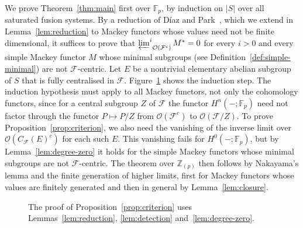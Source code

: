 \documentclass[10pt]{amsart}
\theoremstyle{definition}
\numberwithin{equation}{section}
\newcommand{\F}{\mathcal F}
\newcommand{\Op}{\mathcal O}
\newcommand{\limi}[2]{\mathop{\varprojlim\nolimits^{#1}}_{#2}}
\begin{document}
We prove Theorem~\ref{thm:main} first over $\mathbb{F}_p$, by induction on $|S|$ over all saturated fusion systems. By a reduction of D\'iaz and Park~\cite[Proposition~4.3]{DP}, which we extend in Lemma~\ref{lem:reduction} to Mackey functors whose values need not be finite dimensional, it suffices to prove that $\limi{i}{\Op(\F^c)}M^*=0$ for every $i>0$ and every simple Mackey functor $M$ whose minimal subgroups (see Definition~\ref{def:simple-minimal}) are not $\F$-centric. Let $E$ be a nontrivial elementary abelian subgroup of $S$ that is fully centralised in $\F$. Figure~\ref{fig:induction} shows the induction step. The induction hypothesis must apply to all Mackey functors, not only the cohomology functors, since for a central subgroup $Z$ of $\F$ the functor $H^n(-;\mathbb{F}_p)$ need not factor through the functor $P\mapsto P/Z$ from $\Op(\F^c)$ to $\Op(\F/Z)$. To prove Proposition~\ref{prop:criterion}, we also need the vanishing of the inverse limit over $\Op(C_\F(E)^c)$ for each such $E$. This vanishing fails for $H^0(-;\mathbb{F}_p)$, but by Lemma~\ref{lem:degree-zero} it holds for the simple Mackey functors whose minimal subgroups are not $\F$-centric. The theorem over $\mathbb{Z}_{(p)}$ then follows by Nakayama's lemma and the finite generation of higher limits, first for Mackey functors whose values are finitely generated and then in general by Lemma~\ref{lem:closure}.

\begin{figure}[ht]
\centering
{}
\caption{The proof of Proposition~\ref{prop:criterion} uses Lemmas~\ref{lem:reduction}, \ref{lem:detection} and~\ref{lem:degree-zero}.}\label{fig:induction}
\end{figure}
\end{document}
